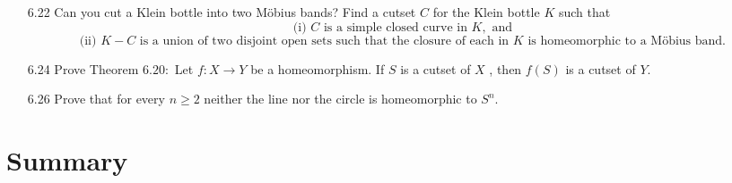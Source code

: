 \documentclass[12pt]{article}
\begin{document}
\begin{enumerate}
		\item[6.22] Can you cut a Klein bottle into two Möbius bands? Find a cutset $C$ for the
		Klein bottle $K$ such that
			\[\text{(i) $C$ is a simple closed curve in $K ,$ and}\]
			\[\text{(ii) $K - C$ is a union of two disjoint open sets such that the closure of
			each in $K$ is homeomorphic to a Möbius band.}\]
		\item[6.24] Prove Theorem $6.20 :$ Let $f : X \rightarrow Y$ be a homeomorphism. If $S$ is a cutset of $X$ , then $f ( S )$ is a cutset of $Y .$
		
		\item[6.26] Prove that for every $n \geq 2$ neither the line nor the circle is homeomorphic to	$S ^ { n } .$
	
	\end{enumerate}
	\section*{Summary}
	
\end{document}
